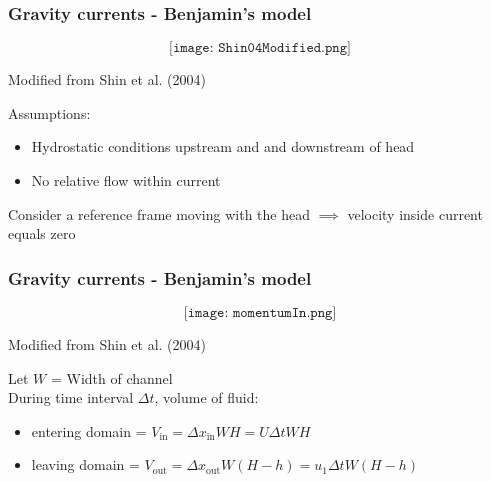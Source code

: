 \documentclass{beamer}
\begin{document}
\begin{frame}
  \frametitle{Gravity currents - Benjamin's model}

  $$\texttt{[image: Shin04Modified.png]}$$

  \vspace{-0.75cm}

  \begin{center}
  \tiny Modified from Shin et al. (2004)
  \end{center}
  \normalsize Assumptions:

  \begin{itemize}
  \item Hydrostatic conditions upstream and and downstream of head \\
  \item No relative flow within current \\
  \end{itemize}

  Consider a reference frame moving with the head $\implies$ velocity inside current equals zero \\
\end{frame}
\begin{frame}
  \frametitle{Gravity currents - Benjamin's model}

  $$\texttt{[image: momentumIn.png]}$$

  \vspace{-0.75cm}

  \begin{center}
  \tiny Modified from Shin et al. (2004)
  \end{center}

  Let $W$ = Width of channel \\

  During time interval $\Delta t$, volume of fluid:

  \begin{itemize}
  \item entering domain = $ V_{\text{in}} = \Delta x_{\text{in}} W H = U \Delta t W H$ \\
  \item leaving domain = $ V_{\text{out}} = \Delta x_{\text{out}} W (H - h) = u_{1} \Delta t W (H - h)$ \\
  \end{itemize}
  
\end{frame}
\end{document}
